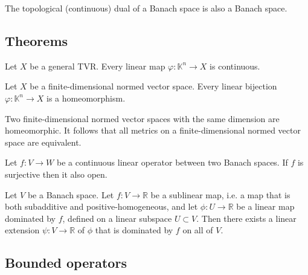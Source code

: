 	\begin{property}
		The topological (continuous) dual of a Banach space is also a Banach space.
	\end{property}

\subsection{Theorems}

	\begin{property}
		Let $X$ be a general TVR. Every linear map $\varphi:\mathbb{K}^n\rightarrow X$ is continuous.
	\end{property}
	\begin{property}
		Let $X$ be a finite-dimensional normed vector space. Every linear bijection $\varphi:\mathbb{K}^n\rightarrow X$ is a homeomorphism.
	\end{property}
	\begin{result}
		Two finite-dimensional normed vector spaces with the same dimension are homeomorphic. It follows that all metrics on a finite-dimensional normed vector space are equivalent.
	\end{result}

	\begin{theorem}
		Let $f:V\rightarrow W$ be a continuous linear operator between two Banach spaces. If $f$ is surjective then it also open.
	\end{theorem}
	
	\begin{theorem}
		Let $V$ be a Banach space. Let $f:V\rightarrow\mathbb{R}$ be a sublinear map, i.e. a map that is both subadditive and positive-homogeneous, and let $\phi:U\rightarrow\mathbb{R}$ be a linear map dominated by $f$, defined on a linear subspace $U\subset V$. Then there exists a linear extension $\psi:V\rightarrow\mathbb{R}$ of $\phi$ that is dominated by $f$ on all of $V$.
	\end{theorem}

\subsection{Bounded operators}
	
